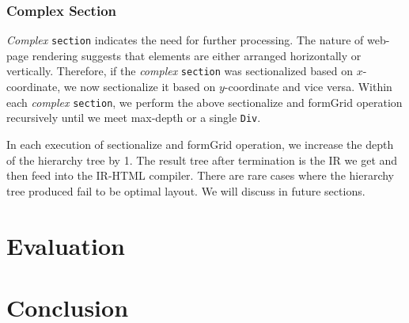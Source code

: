 \documentclass[runningheads]{llncs}
\begin{document}
\subsubsection{Complex Section}
\textit{Complex} \lstinline{section} indicates the need for further processing. The nature of web-page rendering suggests that elements are either arranged horizontally or vertically. Therefore, if the \textit{complex} \lstinline{section} was sectionalized based on $x$-coordinate, we now sectionalize it based on $y$-coordinate and vice versa. Within each \textit{complex} \lstinline{section}, we perform the above sectionalize and formGrid operation recursively until we meet max-depth or a single \lstinline{Div}.

In each execution of sectionalize and formGrid operation, we increase the depth of the hierarchy tree by 1. The result tree after termination is the IR we get and then feed into the IR-HTML compiler.
There are rare cases where the hierarchy tree produced fail to be optimal layout. We will discuss in future sections.



\section{Evaluation}
\section{Conclusion}
\end{document}
